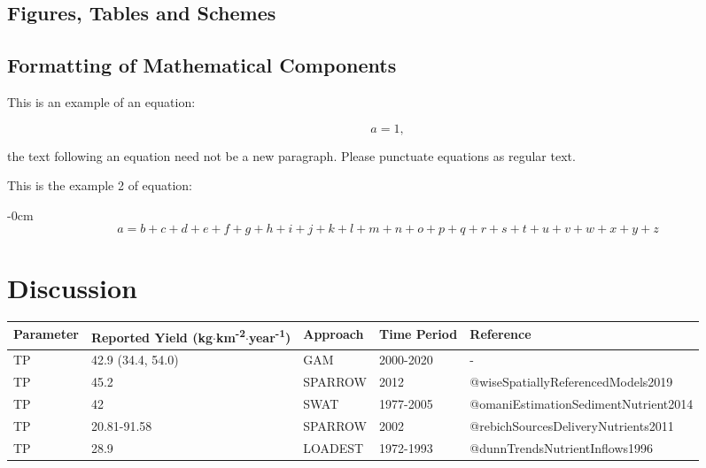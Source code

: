 \documentclass[water,article,submit,oneauthor]{Definitions/mdpi}
\begin{document}
\hypertarget{figures-tables-and-schemes}{%
\subsection{Figures, Tables and
Schemes}\label{figures-tables-and-schemes}}

\hypertarget{formatting-of-mathematical-components}{%
\subsection{Formatting of Mathematical
Components}\label{formatting-of-mathematical-components}}

This is an example of an equation:

\begin{equation}
a = 1,
\end{equation}

the text following an equation need not be a new paragraph. Please
punctuate equations as regular text.

This is the example 2 of equation:

\begin{adjustwidth}{-\extralength}{0cm}
\begin{equation}
a = b + c + d + e + f + g + h + i + j + k + l + m + n + o + p + q + r + s + t + 
u + v + w + x + y + z
\end{equation}
\end{adjustwidth}

\hypertarget{discussion}{%
\section{Discussion}\label{discussion}}

\begin{table}[H]

\begin{tabular}[t]{lllll}
\toprule
Parameter & \makecell[c]{Reported Yield\\(kg$\cdot$km\textsuperscript{-2}$\cdot$year\textsuperscript{-1})} & Approach & Time Period & Reference\\
\midrule
TP & 42.9 (34.4, 54.0) & GAM & 2000-2020 & -\\
TP & 45.2 & SPARROW & 2012 & @wiseSpatiallyReferencedModels2019\\
TP & 42 & SWAT & 1977-2005 & @omaniEstimationSedimentNutrient2014\\
TP & 20.81-91.58 & SPARROW & 2002 & @rebichSourcesDeliveryNutrients2011\\
TP & 28.9 & LOADEST & 1972-1993 & @dunnTrendsNutrientInflows1996\\
\bottomrule
\end{tabular}
\end{table}
\end{document}

